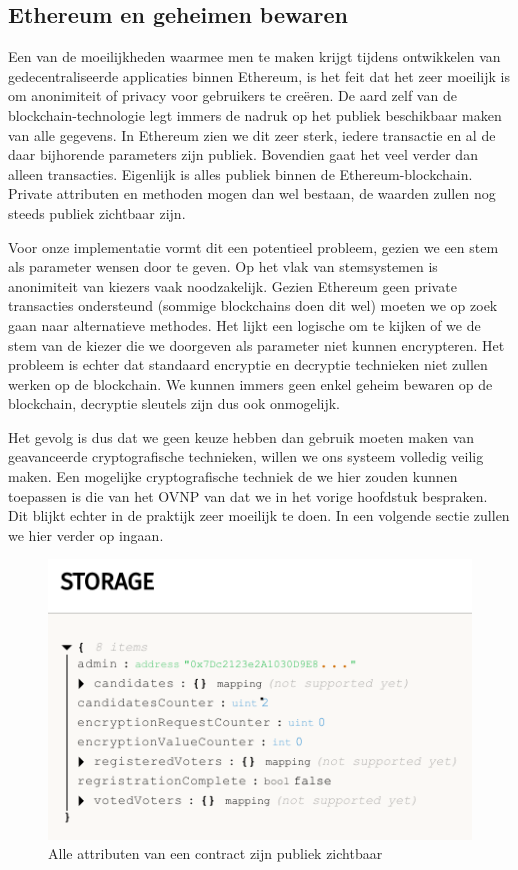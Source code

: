 	\subsection{Ethereum en geheimen bewaren}
	Een van de moeilijkheden waarmee men te maken krijgt tijdens ontwikkelen van gedecentraliseerde applicaties binnen Ethereum, is het feit dat het zeer moeilijk is om anonimiteit of privacy voor gebruikers te creëren. De aard zelf van de blockchain-technologie legt immers de nadruk op het publiek beschikbaar maken van alle gegevens. In Ethereum zien we dit zeer sterk, iedere transactie en al de daar bijhorende parameters zijn publiek.  Bovendien gaat het veel verder dan alleen transacties. Eigenlijk is alles publiek binnen de Ethereum-blockchain. Private attributen en methoden mogen dan wel bestaan, de waarden zullen nog steeds publiek zichtbaar zijn. \autocite{Buterin2014}
	
	Voor onze implementatie vormt dit een potentieel probleem, gezien we een stem als parameter wensen door te geven. Op het vlak van stemsystemen is anonimiteit van kiezers  vaak noodzakelijk. Gezien Ethereum geen private transacties ondersteund (sommige blockchains doen dit wel)  moeten we op zoek gaan naar alternatieve methodes. Het lijkt een logische om te kijken of we de stem van de kiezer die we doorgeven als parameter niet kunnen encrypteren. Het probleem is echter dat standaard encryptie en decryptie technieken niet zullen werken op de blockchain. We kunnen immers geen enkel geheim bewaren op de blockchain,  decryptie sleutels zijn dus ook onmogelijk.
	
	Het gevolg is dus dat we geen keuze hebben dan gebruik moeten maken van  geavanceerde cryptografische technieken, willen we ons systeem volledig veilig maken. Een mogelijke cryptografische techniek de we hier zouden kunnen toepassen is die van het OVNP van \textcite{McCorry2017} dat we in het vorige hoofdstuk bespraken. Dit blijkt echter in de praktijk zeer moeilijk te doen. In een volgende sectie zullen we hier verder op ingaan.	
	
	\begin{figure}
		\centering
		\includegraphics[width=\linewidth/2]{img/contracts-ganache4.png}
		\caption{Alle attributen van een contract zijn publiek zichtbaar}
		\label{fig:contracts-ganache4}
	\end{figure}

